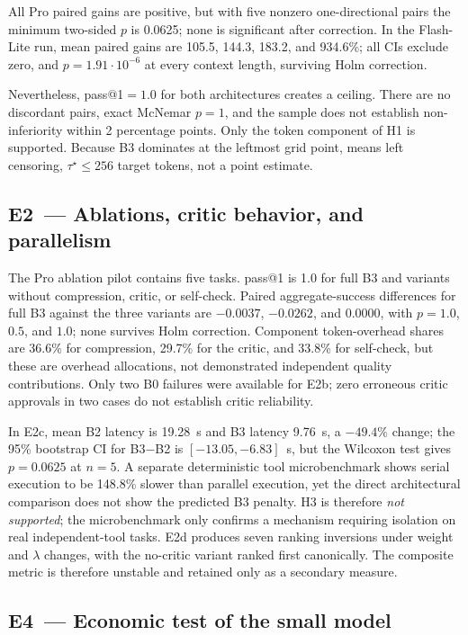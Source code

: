 All Pro paired gains are positive, but with five nonzero one-directional pairs the minimum two-sided $p$ is 0.0625; none is significant after correction. In the Flash-Lite run, mean paired gains are 105.5, 144.3, 183.2, and 934.6\%; all CIs exclude zero, and $p=1.91\cdot10^{-6}$ at every context length, surviving Holm correction.

Nevertheless, pass@1${}=1.0$ for both architectures creates a ceiling. There are no discordant pairs, exact McNemar $p=1$, and the sample does not establish non-inferiority within 2 percentage points. Only the token component of H1 is supported. Because B3 dominates at the leftmost grid point,  means left censoring, $\tau^\star\le256$ target tokens, not a point estimate.

\subsection{E2~--- Ablations, critic behavior, and parallelism}\label{subsec:e2}

The Pro ablation pilot contains five tasks. pass@1 is 1.0 for full B3 and variants without compression, critic, or self-check. Paired aggregate-success differences for full B3 against the three variants are $-0.0037$, $-0.0262$, and $0.0000$, with $p=1.0$, $0.5$, and $1.0$; none survives Holm correction. Component token-overhead shares are 36.6\% for compression, 29.7\% for the critic, and 33.8\% for self-check, but these are overhead allocations, not demonstrated independent quality contributions. Only two B0 failures were available for E2b; zero erroneous critic approvals in two cases do not establish critic reliability.

In E2c, mean B2 latency is 19.28~s and B3 latency 9.76~s, a $-49.4\%$ change; the 95\% bootstrap CI for B3$-$B2 is $[-13.05,-6.83]$~s, but the Wilcoxon test gives $p=0.0625$ at $n=5$. A separate deterministic tool microbenchmark shows serial execution to be 148.8\% slower than parallel execution, yet the direct architectural comparison does not show the predicted B3 penalty. H3 is therefore \emph{not supported}; the microbenchmark only confirms a mechanism requiring isolation on real independent-tool tasks. E2d produces seven ranking inversions under weight and $\lambda$ changes, with the no-critic variant ranked first canonically. The composite metric is therefore unstable and retained only as a secondary measure.

\subsection{E4~--- Economic test of the small model}\label{subsec:e4}

